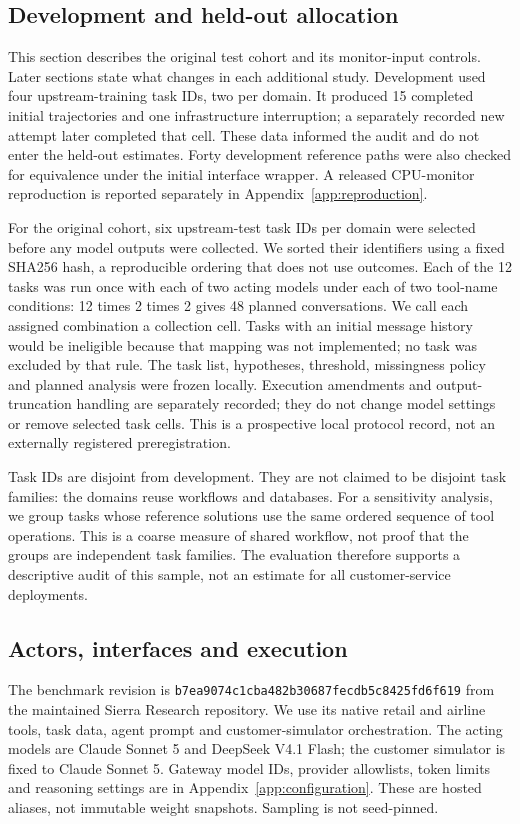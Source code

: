 \subsection{Development and held-out allocation}
This section describes the original test cohort and its monitor-input controls. Later sections state what changes in each additional study. Development used four upstream-training task IDs, two per domain. It produced 15 completed initial trajectories and one infrastructure interruption; a separately recorded new attempt later completed that cell. These data informed the audit and do not enter the held-out estimates. Forty development reference paths were also checked for equivalence under the initial interface wrapper. A released CPU-monitor reproduction is reported separately in Appendix~\ref{app:reproduction}.

For the original cohort, six upstream-test task IDs per domain were selected before any model outputs were collected. We sorted their identifiers using a fixed SHA256 hash, a reproducible ordering that does not use outcomes. Each of the 12 tasks was run once with each of two acting models under each of two tool-name conditions: 12 times 2 times 2 gives 48 planned conversations. We call each assigned combination a collection cell. Tasks with an initial message history would be ineligible because that mapping was not implemented; no task was excluded by that rule. The task list, hypotheses, threshold, missingness policy and planned analysis were frozen locally. Execution amendments and output-truncation handling are separately recorded; they do not change model settings or remove selected task cells. This is a prospective local protocol record, not an externally registered preregistration.

Task IDs are disjoint from development. They are not claimed to be disjoint task families: the domains reuse workflows and databases. For a sensitivity analysis, we group tasks whose reference solutions use the same ordered sequence of tool operations. This is a coarse measure of shared workflow, not proof that the groups are independent task families. The evaluation therefore supports a descriptive audit of this sample, not an estimate for all customer-service deployments.

\subsection{Actors, interfaces and execution}
The benchmark revision is \texttt{b7ea9074c1cba482b30687fecdb5c8425fd6f619} from the maintained Sierra Research repository. We use its native retail and airline tools, task data, agent prompt and customer-simulator orchestration. The acting models are Claude Sonnet 5 and DeepSeek V4.1 Flash; the customer simulator is fixed to Claude Sonnet 5. Gateway model IDs, provider allowlists, token limits and reasoning settings are in Appendix~\ref{app:configuration}. These are hosted aliases, not immutable weight snapshots. Sampling is not seed-pinned.

